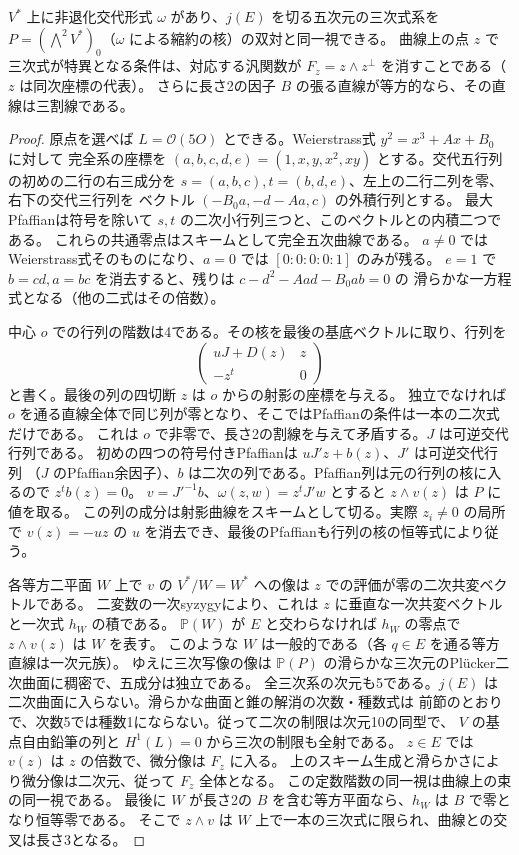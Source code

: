 \begin{lemma}\label{lem:quintic-cubic-polar}
$V^*$ 上に非退化交代形式 $\omega$ があり、$j(E)$ を切る五次元の三次式系を
$P=(\bigwedge^2 V^*)_0$（$\omega$ による縮約の核）の双対と同一視できる。
曲線上の点 $z$ で三次式が特異となる条件は、対応する汎関数が
$F_z=z\wedge z^\perp$ を消すことである（$z$ は同次座標の代表）。
さらに長さ2の因子 $B$ の張る直線が等方的なら、その直線は三割線である。
\end{lemma}
\begin{proof}
原点を選べば $L=\mathcal O(5O)$ とできる。Weierstrass式 $y^2=x^3+A x+B_0$ に対して
完全系の座標を $(a,b,c,d,e)=(1,x,y,x^2,xy)$ とする。交代五行列の初めの二行の右三成分を
$s=(a,b,c),t=(b,d,e)$、左上の二行二列を零、右下の交代三行列を
ベクトル $(-B_0 a,-d-Aa,c)$ の外積行列とする。
最大Pfaffianは符号を除いて $s,t$ の二次小行列三つと、このベクトルとの内積二つである。
これらの共通零点はスキームとして完全五次曲線である。
$a\ne0$ ではWeierstrass式そのものになり、$a=0$ では $[0:0:0:0:1]$ のみが残る。
$e=1$ で $b=cd,a=bc$ を消去すると、残りは $c-d^2-Aad-B_0 ab=0$ の
滑らかな一方程式となる（他の二式はその倍数）。

中心 $o$ での行列の階数は4である。その核を最後の基底ベクトルに取り、行列を
\[
 \begin{pmatrix} uJ+D(z)&z\\-z^t&0\end{pmatrix}
\]
と書く。最後の列の四切断 $z$ は $o$ からの射影の座標を与える。
独立でなければ $o$ を通る直線全体で同じ列が零となり、そこではPfaffianの条件は一本の二次式だけである。
これは $o$ で非零で、長さ2の割線を与えて矛盾する。$J$ は可逆交代行列である。
初めの四つの符号付きPfaffianは $uJ' z+b(z)$、$J'$ は可逆交代行列
（$J$ のPfaffian余因子）、$b$ は二次の列である。Pfaffian列は元の行列の核に入るので $z^tb(z)=0$。
$v=J'^{-1}b$、$\omega(z,w)=z^tJ'w$ とすると $z\wedge v(z)$ は $P$ に値を取る。
この列の成分は射影曲線をスキームとして切る。実際 $z_i\ne0$ の局所で
$v(z)=-uz$ の $u$ を消去でき、最後のPfaffianも行列の核の恒等式により従う。

各等方二平面 $W$ 上で $v$ の $V^*/W=W^*$ への像は $z$ での評価が零の二次共変ベクトルである。
二変数の一次syzygyにより、これは $z$ に垂直な一次共変ベクトルと一次式 $h_W$ の積である。
$\mathbb P(W)$ が $E$ と交わらなければ $h_W$ の零点で $z\wedge v(z)$ は $W$ を表す。
このような $W$ は一般的である（各 $q\in E$ を通る等方直線は一次元族）。
ゆえに三次写像の像は $\mathbb P(P)$ の滑らかな三次元のPlücker二次曲面に稠密で、五成分は独立である。
全三次系の次元も5である。$j(E)$ は二次曲面に入らない。滑らかな曲面と錐の解消の次数・種数式は
前節のとおりで、次数5では種数1にならない。従って二次の制限は次元10の同型で、
$V$ の基点自由鉛筆の列と $H^1(L)=0$ から三次の制限も全射である。
$z\in E$ では $v(z)$ は $z$ の倍数で、微分像は $F_z$ に入る。
上のスキーム生成と滑らかさにより微分像は二次元、従って $F_z$ 全体となる。
この定数階数の同一視は曲線上の束の同一視である。
最後に $W$ が長さ2の $B$ を含む等方平面なら、$h_W$ は $B$ で零となり恒等零である。
そこで $z\wedge v$ は $W$ 上で一本の三次式に限られ、曲線との交叉は長さ3となる。
\end{proof}

